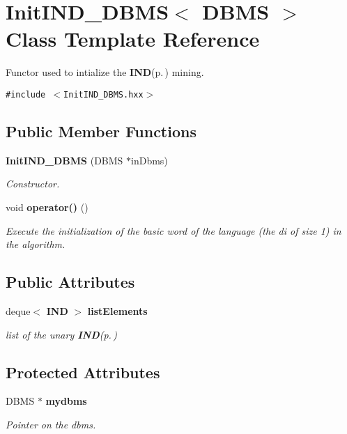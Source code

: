 \section{Init\-IND\_\-DBMS$<$ DBMS $>$ Class Template Reference}
\label{class_init_i_n_d___d_b_m_s}
Functor used to intialize the {\bf IND}{\rm (p.\,\pageref{class_i_n_d})} mining.  


{\tt \#include $<$Init\-IND\_\-DBMS.hxx$>$}

\subsection*{Public Member Functions}
\begin{CompactItemize}
\item 
{\bf Init\-IND\_\-DBMS} (DBMS $\ast$in\-Dbms)
\begin{CompactList}\small\item\em Constructor. \item\end{CompactList}\item 
void {\bf operator()} ()\label{class_init_i_n_d___d_b_m_s_745efc71662e13dd81b11c1af3b39a28}

\begin{CompactList}\small\item\em Execute the initialization of the basic word of the language (the di of size 1) in the algorithm. \item\end{CompactList}\end{CompactItemize}
\subsection*{Public Attributes}
\begin{CompactItemize}
\item 
deque$<$ {\bf IND} $>$ {\bf list\-Elements}\label{class_init_i_n_d___d_b_m_s_58b846134793297ec3c99fa773c1d6d8}

\begin{CompactList}\small\item\em list of the unary {\bf IND}{\rm (p.\,\pageref{class_i_n_d})} \item\end{CompactList}\end{CompactItemize}
\subsection*{Protected Attributes}
\begin{CompactItemize}
\item 
DBMS $\ast$ {\bf mydbms}\label{class_init_i_n_d___d_b_m_s_a63c8d8ea2a044779d5cc55750e2fab3}

\begin{CompactList}\small\item\em Pointer on the dbms. \item\end{CompactList}\end{CompactItemize}


